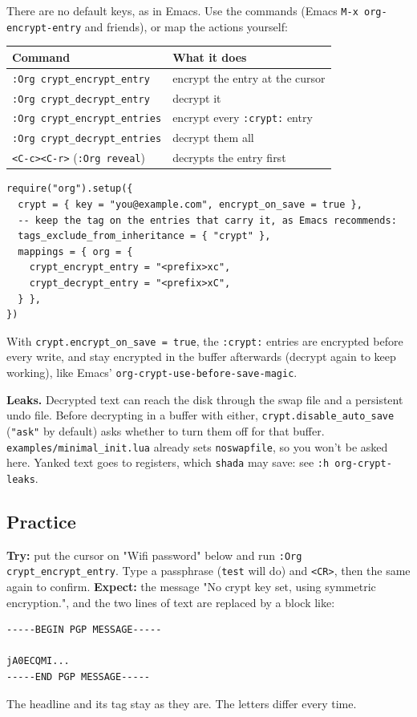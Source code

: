 There are no default keys, as in Emacs. Use the commands (Emacs
\texttt{M-x org-encrypt-entry} and friends), or map the actions yourself:

\begin{center}
\begin{tabular}{ll}
Command & What it does\\
\hline
\texttt{:Org crypt\_encrypt\_entry} & encrypt the entry at the cursor\\
\texttt{:Org crypt\_decrypt\_entry} & decrypt it\\
\texttt{:Org crypt\_encrypt\_entries} & encrypt every \texttt{:crypt:} entry\\
\texttt{:Org crypt\_decrypt\_entries} & decrypt them all\\
\texttt{<C-c><C-r>} (\texttt{:Org reveal}) & decrypts the entry first\\
\end{tabular}
\end{center}

\begin{verbatim}
require("org").setup({
  crypt = { key = "you@example.com", encrypt_on_save = true },
  -- keep the tag on the entries that carry it, as Emacs recommends:
  tags_exclude_from_inheritance = { "crypt" },
  mappings = { org = {
    crypt_encrypt_entry = "<prefix>xc",
    crypt_decrypt_entry = "<prefix>xC",
  } },
})
\end{verbatim}

With \texttt{crypt.encrypt\_on\_save = true}, the \texttt{:crypt:} entries are encrypted
before every write, and stay encrypted in the buffer afterwards (decrypt
again to keep working), like Emacs' \texttt{org-crypt-use-before-save-magic}.

\textbf{Leaks.} Decrypted text can reach the disk through the swap file and a
persistent undo file. Before decrypting in a buffer with either,
\texttt{crypt.disable\_auto\_save} (\texttt{"ask"} by default) asks whether to turn them
off for that buffer. \texttt{examples/minimal\_init.lua} already sets
\texttt{noswapfile}, so you won't be asked here. Yanked text goes to registers,
which \texttt{shada} may save: see \texttt{:h org-crypt-leaks}.
\subsection{Practice}
\label{sec:org8dacc29}
\textbf{Try:} put the cursor on "Wifi password" below and run
\texttt{:Org crypt\_encrypt\_entry}. Type a passphrase (\texttt{test} will do) and
\texttt{<CR>}, then the same again to confirm.
\textbf{Expect:} the message "No crypt key set, using symmetric encryption.",
and the two lines of text are replaced by a block like:
\begin{verbatim}
-----BEGIN PGP MESSAGE-----

jA0ECQMI...
-----END PGP MESSAGE-----
\end{verbatim}
The headline and its tag stay as they are. The letters differ every time.

